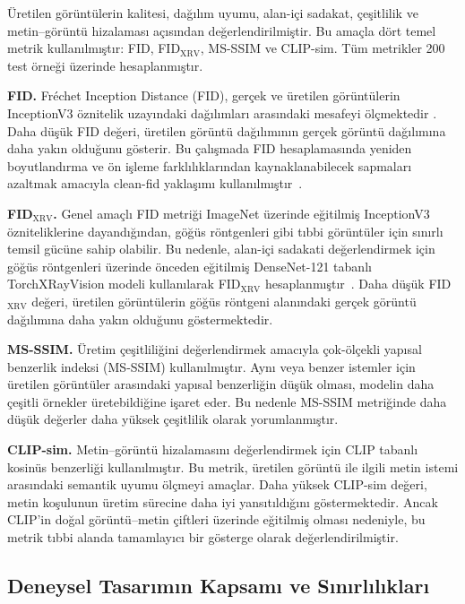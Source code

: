 \documentclass[11pt]{article}
\begin{document}
Üretilen görüntülerin kalitesi, dağılım uyumu, alan-içi sadakat, çeşitlilik ve
metin--görüntü hizalaması açısından değerlendirilmiştir. Bu amaçla dört temel
metrik kullanılmıştır: FID, FID$_{\text{XRV}}$, MS-SSIM ve CLIP-sim. Tüm
metrikler 200 test örneği üzerinde hesaplanmıştır.

\textbf{FID.} Fréchet Inception Distance (FID), gerçek ve üretilen görüntülerin
InceptionV3 öznitelik uzayındaki dağılımları arasındaki mesafeyi ölçmektedir
\cite{fid}. Daha düşük FID değeri, üretilen görüntü dağılımının gerçek görüntü
dağılımına daha yakın olduğunu gösterir. Bu çalışmada FID hesaplamasında
yeniden boyutlandırma ve ön işleme farklılıklarından kaynaklanabilecek
sapmaları azaltmak amacıyla clean-fid yaklaşımı kullanılmıştır~\cite{cleanfid}.

\textbf{FID$_{\text{XRV}}$.} Genel amaçlı FID metriği ImageNet üzerinde
eğitilmiş InceptionV3 özniteliklerine dayandığından, göğüs röntgenleri gibi
tıbbi görüntüler için sınırlı temsil gücüne sahip olabilir. Bu nedenle,
alan-içi sadakati değerlendirmek için göğüs röntgenleri üzerinde önceden
eğitilmiş DenseNet-121 tabanlı TorchXRayVision modeli kullanılarak
FID$_{\text{XRV}}$ hesaplanmıştır~\cite{xrv}. Daha düşük FID$_{\text{XRV}}$
değeri, üretilen görüntülerin göğüs röntgeni alanındaki gerçek görüntü
dağılımına daha yakın olduğunu göstermektedir.

\textbf{MS-SSIM.} Üretim çeşitliliğini değerlendirmek amacıyla çok-ölçekli
yapısal benzerlik indeksi (MS-SSIM) kullanılmıştır. Aynı veya benzer istemler
için üretilen görüntüler arasındaki yapısal benzerliğin düşük olması, modelin
daha çeşitli örnekler üretebildiğine işaret eder. Bu nedenle MS-SSIM metriğinde
daha düşük değerler daha yüksek çeşitlilik olarak yorumlanmıştır.

\textbf{CLIP-sim.} Metin--görüntü hizalamasını değerlendirmek için CLIP tabanlı
kosinüs benzerliği kullanılmıştır. Bu metrik, üretilen görüntü ile ilgili metin
istemi arasındaki semantik uyumu ölçmeyi amaçlar. Daha yüksek CLIP-sim değeri,
metin koşulunun üretim sürecine daha iyi yansıtıldığını göstermektedir. Ancak
CLIP'in doğal görüntü--metin çiftleri üzerinde eğitilmiş olması nedeniyle,
bu metrik tıbbi alanda tamamlayıcı bir gösterge olarak değerlendirilmiştir.

\subsection{Deneysel Tasarımın Kapsamı ve Sınırlılıkları}
\end{document}
